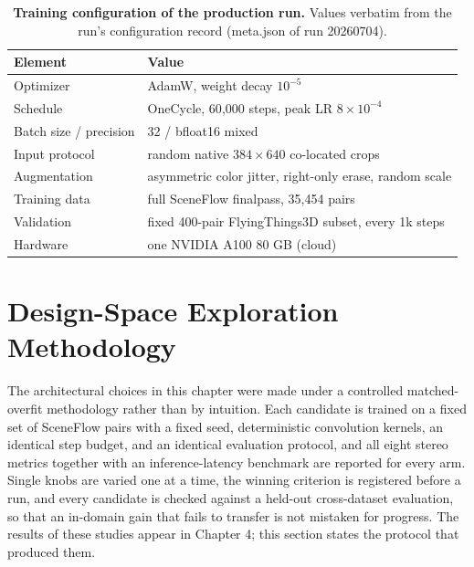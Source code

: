 \begin{table}[!htbp]
\centering
\caption{\textbf{Training configuration of the production run.} Values verbatim from the run's configuration record (meta.json of run 20260704).}
\label{tab:train_config}
\small
\begin{tabular}{ll}
\toprule
Element & Value\\
\midrule
Optimizer & AdamW, weight decay $10^{-5}$\\
Schedule & OneCycle, 60{,}000 steps, peak LR $8\times 10^{-4}$\\
Batch size / precision & 32 / bfloat16 mixed\\
Input protocol & random native $384\times 640$ co-located crops\\
Augmentation & asymmetric color jitter, right-only erase, random scale\\
Training data & full SceneFlow finalpass, 35{,}454 pairs\\
Validation & fixed 400-pair FlyingThings3D subset, every 1k steps\\
Hardware & one NVIDIA A100 80 GB (cloud)\\
\bottomrule
\end{tabular}
\end{table}

\section{Design-Space Exploration Methodology}
The architectural choices in this chapter were made under a controlled
matched-overfit methodology rather than by intuition. Each candidate is
trained on a fixed set of SceneFlow pairs with a fixed seed, deterministic
convolution kernels, an identical step budget, and an identical evaluation
protocol, and all eight stereo metrics together with an inference-latency
benchmark are reported for every arm. Single knobs are varied one at a
time, the winning criterion is registered before a run, and every
candidate is checked against a held-out cross-dataset evaluation, so that
an in-domain gain that fails to transfer is not mistaken for progress. The
results of these studies appear in Chapter 4; this section states the
protocol that produced them.


